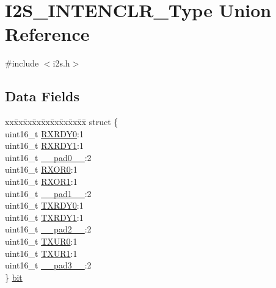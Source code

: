 \hypertarget{union_i2_s___i_n_t_e_n_c_l_r___type}{}\section{I2\+S\+\_\+\+I\+N\+T\+E\+N\+C\+L\+R\+\_\+\+Type Union Reference}
\label{union_i2_s___i_n_t_e_n_c_l_r___type}


{\ttfamily \#include $<$i2s.\+h$>$}

\subsection*{Data Fields}
\begin{DoxyCompactItemize}
\item 
\begin{tabbing}
xx\=xx\=xx\=xx\=xx\=xx\=xx\=xx\=xx\=\kill
struct \{\\
\>uint16\_t \mbox{\hyperlink{union_i2_s___i_n_t_e_n_c_l_r___type_a5807dcf889cc62a982386261d5a43f91}{RXRDY0}}:1\\
\>uint16\_t \mbox{\hyperlink{union_i2_s___i_n_t_e_n_c_l_r___type_a4a00cf88e57ed9e62fadfb21e6f688eb}{RXRDY1}}:1\\
\>uint16\_t \mbox{\hyperlink{union_i2_s___i_n_t_e_n_c_l_r___type_a77132c2c26a75f5b8751b235cda23828}{\_\_pad0\_\_}}:2\\
\>uint16\_t \mbox{\hyperlink{union_i2_s___i_n_t_e_n_c_l_r___type_abed2656e20bf2d1c2fba02932118afeb}{RXOR0}}:1\\
\>uint16\_t \mbox{\hyperlink{union_i2_s___i_n_t_e_n_c_l_r___type_aca907c0af3ebd3e69743961434b7b82d}{RXOR1}}:1\\
\>uint16\_t \mbox{\hyperlink{union_i2_s___i_n_t_e_n_c_l_r___type_ab72e3a1f2f7db8695c60c658f5a0f11a}{\_\_pad1\_\_}}:2\\
\>uint16\_t \mbox{\hyperlink{union_i2_s___i_n_t_e_n_c_l_r___type_a8eb494bdde9c6c1e3c38cb0d8afc13c2}{TXRDY0}}:1\\
\>uint16\_t \mbox{\hyperlink{union_i2_s___i_n_t_e_n_c_l_r___type_a7b2f75289a88e9c3ae8bc11c67680680}{TXRDY1}}:1\\
\>uint16\_t \mbox{\hyperlink{union_i2_s___i_n_t_e_n_c_l_r___type_a82701c5ec65a0fca9a84d8edc46a8192}{\_\_pad2\_\_}}:2\\
\>uint16\_t \mbox{\hyperlink{union_i2_s___i_n_t_e_n_c_l_r___type_a8e7545242f7eece2adcdc5c6f1f24822}{TXUR0}}:1\\
\>uint16\_t \mbox{\hyperlink{union_i2_s___i_n_t_e_n_c_l_r___type_ab45ae64a8c730600a185df6513d0b469}{TXUR1}}:1\\
\>uint16\_t \mbox{\hyperlink{union_i2_s___i_n_t_e_n_c_l_r___type_a1b0a1a9de051f3174325808d959500f7}{\_\_pad3\_\_}}:2\\
\} \mbox{\hyperlink{union_i2_s___i_n_t_e_n_c_l_r___type_ad9a0ae882a9b5f4ccc5da0da4bf9277d}{bit}}\\


\end{tabbing}
\end{DoxyCompactItemize}
